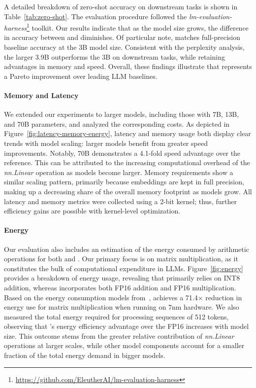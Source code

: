 A detailed breakdown of zero-shot accuracy on downstream tasks is shown in Table~\ref{tab:zero-shot}. The evaluation procedure followed the \emph{lm-evaluation-harness}\footnote{\url{https://github.com/EleutherAI/lm-evaluation-harness}} toolkit. Our results indicate that as the model size grows, the difference in accuracy between  and  diminishes. Of particular note,  matches full-precision baseline accuracy at the 3B model size. Consistent with the perplexity analysis, the larger 3.9B  outperforms the 3B  on downstream tasks, while retaining advantages in memory and speed. Overall, these findings illustrate that  represents a Pareto improvement over leading LLM baselines.

\paragraph{Memory and Latency}

We extended our experiments to larger models, including those with 7B, 13B, and 70B parameters, and analyzed the corresponding costs. As depicted in Figure~\ref{fig:latency-memory-energy}, latency and memory usage both display clear trends with model scaling: larger models benefit from greater speed improvements. Notably,  70B demonstrates a 4.1-fold speed advantage over the  reference. This can be attributed to the increasing computational overhead of the \emph{nn.Linear} operation as models become larger. Memory requirements show a similar scaling pattern, primarily because embeddings are kept in full precision, making up a decreasing share of the overall memory footprint as models grow. All latency and memory metrics were collected using a 2-bit kernel; thus, further efficiency gains are possible with kernel-level optimization.

\paragraph{Energy}

Our evaluation also includes an estimation of the energy consumed by arithmetic operations for both  and . Our primary focus is on matrix multiplication, as it constitutes the bulk of computational expenditure in LLMs. Figure~\ref{fig:energy} provides a breakdown of energy usage, revealing that  primarily relies on INT8 addition, whereas  incorporates both FP16 addition and FP16 multiplication. Based on the energy consumption models from~\cite{energycost, pokebnn},  achieves a 71.4$\times$ reduction in energy use for matrix multiplication when running on 7nm hardware. We also measured the total energy required for processing sequences of 512 tokens, observing that 's energy efficiency advantage over the FP16  increases with model size. This outcome stems from the greater relative contribution of \emph{nn.Linear} operations at larger scales, while other model components account for a smaller fraction of the total energy demand in bigger models.

